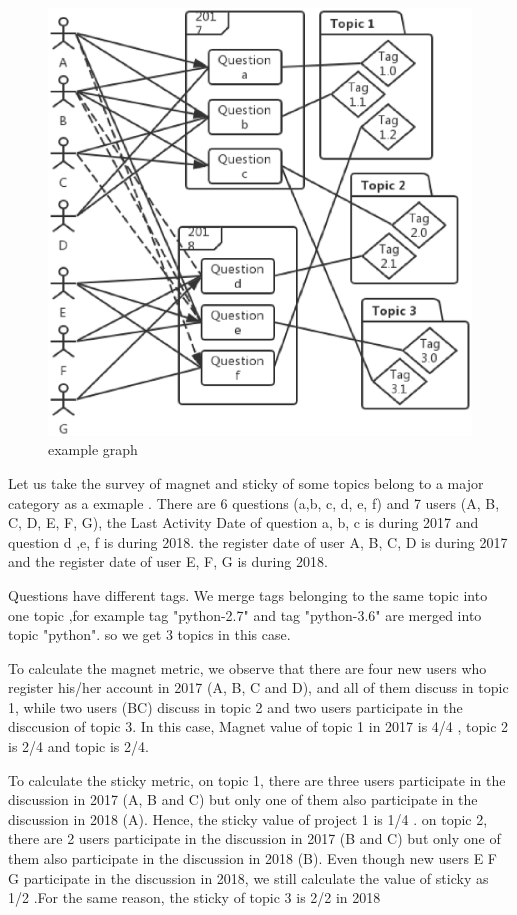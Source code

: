 \documentclass[conference]{IEEEtran}
\begin{document}
\begin{figure}[t]
 \centering
 \includegraphics[width=.9\hsize]{img/examplegraph1.eps}  
 \caption{example graph} 
 \label{fig:example1} 
\end{figure}


Let us take the survey of magnet and sticky of some topics belong to a major category as a exmaple . There are 6 questions (a,b, c, d, e, f) and 7 users (A, B, C, D, E, F, G), the Last Activity Date of question a, b, c is during 2017 and question d ,e, f is during 2018. the register date of user A, B, C, D is during 2017 and the register date of user E, F, G is during 2018.

Questions have different tags. We merge tags belonging to the same topic into one topic ,for example tag "python-2.7" and tag "python-3.6" are merged into topic "python". so we get 3 topics in this case.

To calculate the magnet metric, we observe that there are four new users who register his/her account in 2017 (A, B, C and D), and all of them discuss in topic 1, while two users (BC) discuss in topic 2 and two users participate in the disccusion of topic 3. In this case, Magnet value of topic 1 in 2017 is 4/4 , topic 2 is 2/4 and topic is 2/4.

To calculate the sticky metric, on topic 1, there are three users participate in the discussion in 2017 (A, B and C) but only one of them also participate in the discussion in 2018 (A). Hence, the sticky value of project 1 is 1/4 . on topic 2, there are 2 users participate in the discussion in 2017 (B and C) but only one of them also participate in the discussion in 2018 (B). Even though new users E F G participate in the discussion in 2018, we still calculate the value of sticky as 1/2 .For the same reason, the sticky of topic 3 is 2/2 in 2018
\end{document}
